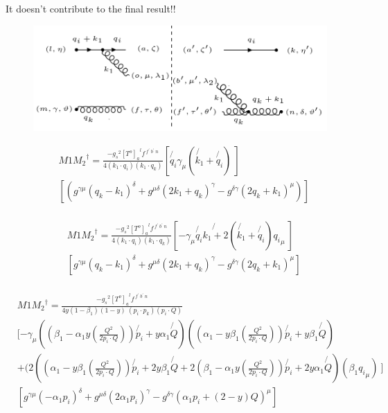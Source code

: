 It doesn't contribute to the final result!!

\begin{figure}[ht!]
\centering
\includegraphics[scale=0.7]{images/GQ/M1M2DaggerGluon.png}
\end{figure}

\begin{equation}
\begin{split}
&M1{M_2}^{\dagger}=\frac{-{g_s}^2 {[T^{o}]_a}^{l} f^{\:f^{\prime}\: b^{\prime}\:n}}{4(k_1 \cdot q_i)(k_1 \cdot q_k)}[\not{q_i}{\gamma}_{\mu}(\not{k_1}+\not{q_i})\:]\\
&[ (g^{{{\gamma}}{{\mu}}}(q_k-k_1)^{\delta}+g^{{{\mu}}{{\delta}}}(2k_1 +q_k)^{{\gamma}}-g^{\delta{{\gamma}}}(2q_k+k_1)^{{\mu}})]\\
\end{split}
\end{equation}

\begin{equation}
\begin{split}
&M1{M_2}^{\dagger}=\frac{-{g_s}^2 {[T^{o}]_a}^{l} f^{\:f^{\prime}\: b^{\prime}\:n}}{4(k_1 \cdot q_i)(k_1 \cdot q_k)}[-\gamma_{\mu}\not{q_i}\not{k_1+2}(\not{k_1}+\not{q_i}){q_i}_{\mu}\:]\\
&[ g^{{{\gamma}}{{\mu}}}(q_k-k_1)^{\delta}+g^{{{\mu}}{{\delta}}}(2k_1+q_k )^{{\gamma}}-g^{\delta{{\gamma}}}(2q_k+k_1)^{{\mu}}]\\
\end{split}
\end{equation}

\begin{equation}
\begin{split}
&M1{M_2}^{\dagger}=\frac{-{g_s}^2 {[T^{o}]_a}^{l} f^{\:f^{\prime}\: b^{\prime}\:n}}{4 y(1-\beta_1) (1-y)\:(p_i \cdot p_k)(p_i \cdot Q)}\\
&[-\gamma_{\mu}((\beta_1 -\alpha_1 y(\frac{Q^2}{2p_i \cdot Q}))\not{p_i} + y\alpha_1\not{Q})((\alpha_1 -y\beta_1(\frac{Q^2}{2p_i \cdot Q})) \not{p_i} + y\beta_1\not{Q})\\
&+(2((\alpha_1 -y\beta_1(\frac{Q^2}{2p_i \cdot Q})) \not{p_i} + 2y\beta_1\not{Q}+2(\beta_1 -\alpha_1 y(\frac{Q^2}{2p_i \cdot Q}))\not{p_i} + 2y\alpha_1\not{Q})(\beta_1{q_i}_{\mu})\:]\\
&[ g^{{{\gamma}}{{\mu}}}(-\alpha_1p_i)^{\delta}+g^{{{\mu}}{{\delta}}}(2\alpha_1p_i )^{{\gamma}}-g^{\delta{{\gamma}}}(\alpha_1p_i+(2-y)Q)^{{\mu}}]\\
\end{split}
\end{equation}

